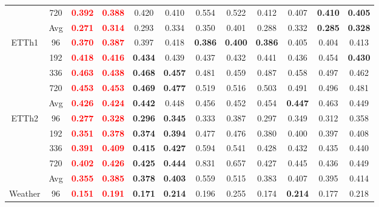 \begin{table}[!htbp]
\begin{tabular}{c|c|cc|cc|cc|cc|cc}
& 720 & \textbf{\textcolor{red}{0.392}} & \textbf{\textcolor{red}{0.388}} & 0.420 & 0.410 & 0.554 & 0.522 & 0.412 & 0.407 & \textbf{0.410} & \textbf{0.405} \\
& Avg & \textbf{\textcolor{red}{0.271}} & \textbf{\textcolor{red}{0.314}} & 0.293 & 0.334 & 0.350 & 0.401 & 0.288 & 0.332 & \textbf{0.285} & \textbf{0.328} \\
\midrule
\multirow{5}{*}{ETTh1}
& 96 & \textbf{\textcolor{red}{0.370}} & \textbf{\textcolor{red}{0.387}} & 0.397 & 0.418 & \textbf{0.386} & \textbf{0.400} & \textbf{0.386} & 0.405 & 0.404 & 0.413 \\
& 192 & \textbf{\textcolor{red}{0.418}} & \textbf{\textcolor{red}{0.416}} & \textbf{0.434} & 0.439 & 0.437 & 0.432 & 0.441 & 0.436 & 0.454 & \textbf{0.430} \\
& 336 & \textbf{\textcolor{red}{0.463}} & \textbf{\textcolor{red}{0.438}} & \textbf{0.468} & \textbf{0.457} & 0.481 & 0.459 & 0.487 & 0.458 & 0.497 & 0.462 \\
& 720 & \textbf{\textcolor{red}{0.453}} & \textbf{\textcolor{red}{0.453}} & \textbf{0.469} & \textbf{0.477} & 0.519 & 0.516 & 0.503 & 0.491 & 0.496 & 0.481 \\
& Avg & \textbf{\textcolor{red}{0.426}} & \textbf{\textcolor{red}{0.424}} & \textbf{0.442} & 0.448 & 0.456 & 0.452 & 0.454 & \textbf{0.447} & 0.463 & 0.449 \\
\midrule
\multirow{5}{*}{ETTh2}
& 96 & \textbf{\textcolor{red}{0.277}} & \textbf{\textcolor{red}{0.328}} & \textbf{0.296} & \textbf{0.345} & 0.333 & 0.387 & 0.297 & 0.349 & 0.312 & 0.358 \\
& 192 & \textbf{\textcolor{red}{0.351}} & \textbf{\textcolor{red}{0.378}} & \textbf{0.374} & \textbf{0.394} & 0.477 & 0.476 & 0.380 & 0.400 & 0.397 & 0.408 \\
& 336 & \textbf{\textcolor{red}{0.391}} & \textbf{\textcolor{red}{0.409}} & \textbf{0.415} & \textbf{0.427} & 0.594 & 0.541 & 0.428 & 0.432 & 0.435 & 0.440 \\
& 720 & \textbf{\textcolor{red}{0.402}} & \textbf{\textcolor{red}{0.426}} & \textbf{0.425} & \textbf{0.444} & 0.831 & 0.657 & 0.427 & 0.445 & 0.436 & 0.449 \\
& Avg & \textbf{\textcolor{red}{0.355}} & \textbf{\textcolor{red}{0.385}} & \textbf{0.378} & \textbf{0.403} & 0.559 & 0.515 & 0.383 & 0.407 & 0.395 & 0.414 \\
\midrule
\multirow{5}{*}{Weather}
& 96 & \textbf{\textcolor{red}{0.151}} & \textbf{\textcolor{red}{0.191}} & \textbf{0.171} & \textbf{0.214} & 0.196 & 0.255 & 0.174 & \textbf{0.214} & 0.177 & 0.218 \\

\end{tabular}
\end{table}
